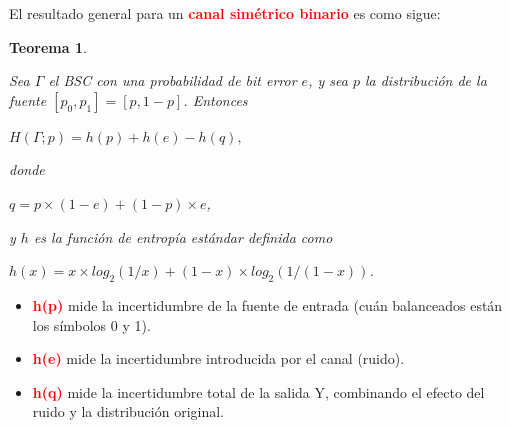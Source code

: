 \documentclass{beamer}
\theoremstyle{plain}
\newtheorem{teorema} [Teorema] {Teorema}
\theoremstyle{example}
\theoremstyle{example}
\begin{document}
\begin{frame}  \small 

El resultado general para un \textcolor{red}{\textbf{canal simétrico binario}} es como sigue:
\begin{teorema}\label{teorema:entropia}

Sea $\Gamma$ el BSC con una probabilidad de bit error $e$, y sea $p$ la distribución de la fuente $[p_0,p_1] = [p, 1-p]$. Entonces

\begin{center}
$H(\Gamma ;p) = h(p)+ h (e)- h (q), $
\end{center}
donde 
\begin{center}
$q = p \times (1 - e) + (1 - p) \times e$, 
\end{center}
y $h$ es la función de entropía estándar definida como\\
\begin{center}
    $h(x) = x \times log_2(1/x) + (1 - x)\times log_2(1/(1 - x))$.
\end{center}
\end{teorema}

\begin{itemize}\tiny
     \item  \textcolor{red}{\textbf{h(p)}} mide la incertidumbre de la fuente de entrada (cuán balanceados están los símbolos 0 y 1).
     \item  \textcolor{red}{\textbf{h(e)}} mide la incertidumbre introducida por el canal (ruido).
     \item  \textcolor{red}{\textbf{h(q)}} mide la incertidumbre total de la salida Y, combinando el efecto del ruido y la distribución original.
\end{itemize}

\end{frame} 
\end{document}
